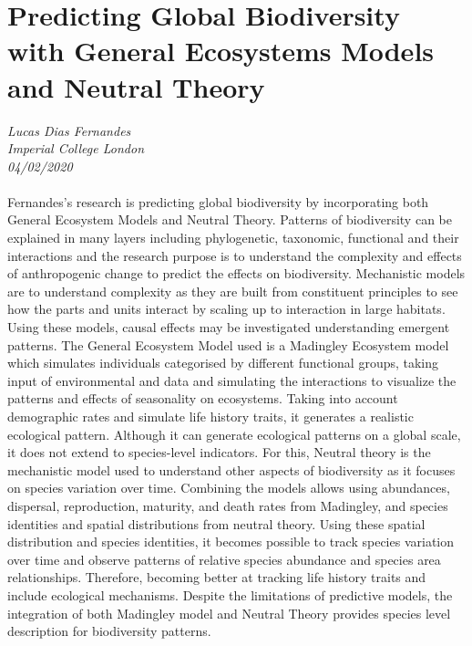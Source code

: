 \documentclass[11pt]{article}
\begin{document}
\newpage

\section{Predicting Global Biodiversity with General Ecosystems Models and Neutral Theory}
\textit{Lucas Dias Fernandes\\Imperial College London\\04/02/2020}
\\
\\Fernandes’s research is predicting global biodiversity by incorporating both General Ecosystem Models and Neutral Theory. Patterns of biodiversity can be explained in many layers including phylogenetic, taxonomic, functional and their interactions and the research purpose is to understand the complexity and effects of anthropogenic change to predict the effects on biodiversity. Mechanistic models are to understand complexity as they are built from constituent principles to see how the parts and units interact by scaling up to interaction in large habitats. Using these models, causal effects may be investigated understanding emergent patterns. The General Ecosystem Model used is a Madingley Ecosystem model which simulates individuals categorised by different functional groups, taking input of environmental and data and simulating the interactions to visualize the patterns and effects of seasonality on ecosystems. Taking into account demographic rates and simulate life history traits, it generates a realistic ecological pattern. Although it can generate ecological patterns on a global scale, it does not extend to species-level indicators. For this, Neutral theory is the mechanistic model used to understand other aspects of biodiversity as it focuses on species variation over time. Combining the models allows using abundances, dispersal, reproduction, maturity, and death rates from Madingley, and species identities and spatial distributions from neutral theory. Using these spatial distribution and species identities, it becomes possible to track species variation over time and observe patterns of relative species abundance and species area relationships. Therefore, becoming better at tracking life history traits and include ecological mechanisms. Despite the limitations of predictive models, the integration of both Madingley model and Neutral Theory provides species level description for biodiversity patterns.
\end{document}
